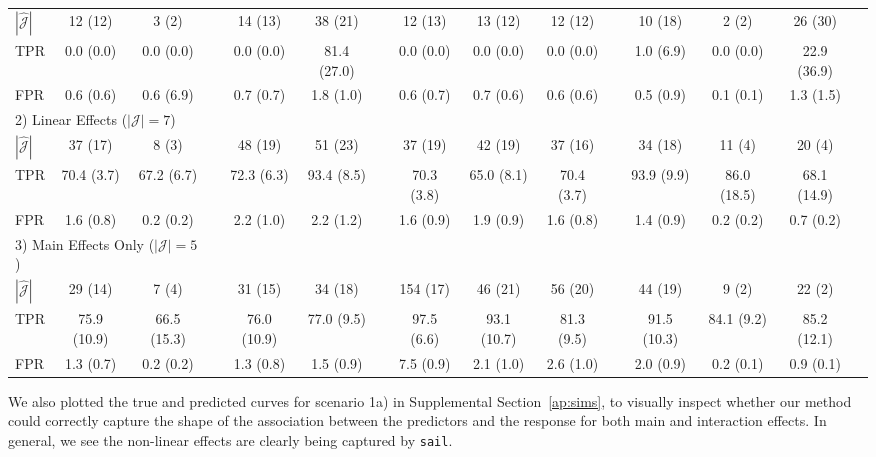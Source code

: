 \documentclass[a4paper,fleqn]{cas-sc}
\newcommand{\sail}{\texttt{sail}}
\newcommand{\mcl}[2]{\multicolumn{#1}{l}{#2}}
\begin{document}
\begin{table}
\begin{tabular}{lcccccccccccccc}
$|\widehat{\mathcal{J}}|$ & 12 (12) & 3 (2)  & & 14 (13) & 38 (21)  & & 12 (13) & 13 (12) & 12 (12)  & & 10 (18) & 2 (2) & 26 (30) \\
TPR & 0.0 (0.0) & 0.0 (0.0)  & & 0.0 (0.0) & 81.4 (27.0)  & & 0.0 (0.0) & 0.0 (0.0) & 0.0 (0.0)  & & 1.0 (6.9) & 0.0 (0.0) & 22.9 (36.9) \\
FPR & 0.6 (0.6) & 0.6 (6.9)  & & 0.7 (0.7) & 1.8 (1.0)  & & 0.6 (0.7) & 0.7 (0.6) & 0.6 (0.6)  & & 0.5 (0.9) & 0.1 (0.1) & 1.3 (1.5) \\
\hline
\mcl{3}{2) Linear Effects ($|\mathcal{J}|=7$)}\\
$|\widehat{\mathcal{J}}|$ & 37 (17) & 8 (3)  & & 48 (19) & 51 (23)  & & 37 (19) & 42 (19) & 37 (16)  & & 34 (18) & 11 (4) & 20 (4) \\
TPR & 70.4 (3.7) & 67.2 (6.7)  & & 72.3 (6.3) & 93.4 (8.5) &  & 70.3 (3.8) & 65.0 (8.1) & 70.4 (3.7)  & & 93.9 (9.9) & 86.0 (18.5) & 68.1 (14.9) \\
FPR & 1.6 (0.8) & 0.2 (0.2)  & & 2.2 (1.0) & 2.2 (1.2)  & & 1.6 (0.9) & 1.9 (0.9) & 1.6 (0.8)  & & 1.4 (0.9) & 0.2 (0.2) & 0.7 (0.2) \\
\hline
\mcl{3}{3) Main Effects Only ($|\mathcal{J}|=5$)}\\
$|\widehat{\mathcal{J}}|$ & 29 (14) & 7 (4)  & & 31 (15) & 34 (18)  & & 154 (17) & 46 (21) & 56 (20) & &  44 (19) & 9 (2) & 22 (2) \\
TPR & 75.9 (10.9) & 66.5 (15.3) & &  76.0 (10.9) & 77.0 (9.5)  & & 97.5 (6.6) & 93.1 (10.7) & 81.3 (9.5) & &  91.5 (10.3) & 84.1 (9.2) & 85.2 (12.1) \\
FPR & 1.3 (0.7) & 0.2 (0.2) & &  1.3 (0.8) & 1.5 (0.9)  & & 7.5 (0.9) & 2.1 (1.0) & 2.6 (1.0)  & & 2.0 (0.9) & 0.2 (0.1) & 0.9 (0.1) \\
\hline
	\end{tabular}
\end{table}

\FloatBarrier

We also plotted the true and predicted curves for scenario 1a) in Supplemental Section~\ref{ap:sims}, to visually inspect whether our method could correctly capture the shape of the association between the predictors and the response for both main and interaction effects. In general, we see the non-linear effects are clearly being captured by \sail. 

\end{document}
